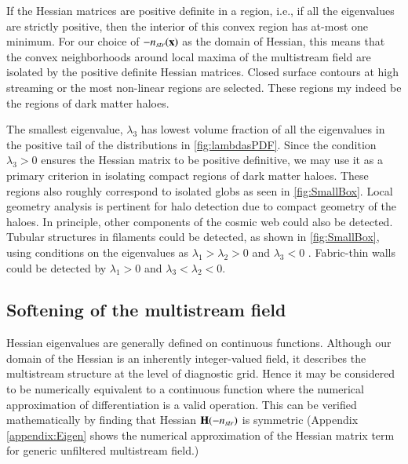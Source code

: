 If the Hessian matrices are positive definite in a region, i.e., if all the eigenvalues are strictly positive, then the interior of this convex region has at-most one minimum. For our choice of $-n_{str}(\bf{x})$ as the domain of Hessian, this means that the convex neighborhoods around local maxima of the multistream field are isolated by the positive definite Hessian matrices. Closed surface contours at high streaming or the most non-linear regions are selected. These regions my indeed be the regions of dark matter haloes.

The smallest eigenvalue, $\lambda_3$ has lowest volume fraction of all the eigenvalues in the positive tail of the distributions in \autoref{fig:lambdasPDF}. Since the condition $\lambda_3 > 0$ ensures the Hessian matrix to be positive definitive, we may use it as a primary criterion in isolating compact regions of dark matter haloes. These regions also roughly correspond to isolated globs as seen in \autoref{fig:SmallBox}. Local geometry analysis is pertinent for halo detection due to compact geometry of the haloes. In principle, other components of the cosmic web could also be detected. Tubular structures in filaments could be detected, as shown in \autoref{fig:SmallBox}, using conditions on the eigenvalues as $\lambda_1 > \lambda_2 > 0$ and $ \lambda_3 < 0$ . Fabric-thin walls could be detected by $\lambda_1 > 0$ and $ \lambda_3 < \lambda_2 < 0$. 

\subsection{Softening of the multistream field}
\label{sub:Softening}


Hessian eigenvalues are generally defined on continuous functions. Although our domain of the Hessian is an inherently integer-valued field, it describes the multistream structure at the level of diagnostic grid. Hence it may be considered to be numerically equivalent to a continuous function where the numerical approximation of differentiation is a valid operation. This can be verified mathematically by finding that Hessian ${\bf H}(-n_{str})$ is symmetric (Appendix \ref{appendix:Eigen} shows the numerical approximation of the Hessian matrix term for generic unfiltered multistream field.)

